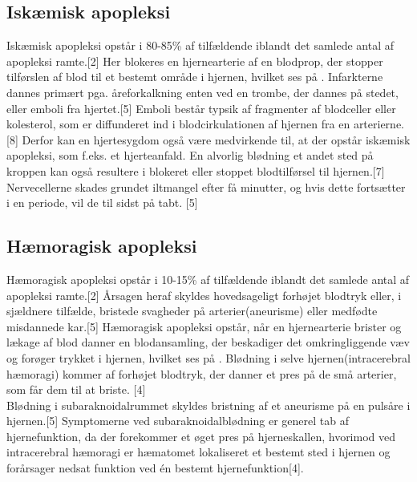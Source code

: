 \subsection{Iskæmisk apopleksi}
Iskæmisk apopleksi opstår i 80-85\% af tilfældende iblandt det samlede antal af apopleksi ramte.[2] Her blokeres en hjernearterie af en blodprop, der stopper tilførslen af blod til et bestemt område i hjernen, hvilket ses på . Infarkterne dannes primært pga. åreforkalkning enten ved en trombe, der dannes på stedet, eller emboli fra hjertet.[5] Emboli består typsik af fragmenter af blodceller eller kolesterol, som er diffunderet ind i blodcirkulationen af hjernen fra en arterierne.[8] Derfor kan en hjertesygdom også være medvirkende til, at der opstår iskæmisk apopleksi, som f.eks. et hjerteanfald. En alvorlig blødning et andet sted på kroppen kan også resultere i blokeret eller stoppet blodtilførsel til hjernen.[7] Nervecellerne skades grundet iltmangel efter få minutter, og hvis dette fortsætter i en periode, vil de til sidst på tabt. [5]

\subsection{Hæmoragisk apopleksi}
Hæmoragisk apopleksi opstår i 10-15\% af tilfældende iblandt det samlede antal af apopleksi ramte.[2] Årsagen heraf skyldes hovedsageligt forhøjet blodtryk eller, i sjældnere tilfælde, bristede svagheder på arterier(aneurisme) eller medfødte misdannede kar.[5] Hæmoragisk apopleksi opstår, når en hjernearterie brister og lækage af blod danner en blodansamling, der beskadiger det omkringliggende væv og forøger trykket i hjernen, hvilket ses på . Blødning i selve hjernen(intracerebral hæmoragi) kommer af forhøjet blodtryk, der danner et pres på de små arterier, som får dem til at briste. [4] \\
Blødning i subaraknoidalrummet skyldes bristning af et aneurisme på en pulsåre i hjernen.[5] Symptomerne ved subaraknoidalblødning er generel tab af hjernefunktion, da der forekommer et øget pres på hjerneskallen, hvorimod ved intracerebral hæmoragi er hæmatomet lokaliseret et bestemt sted i hjernen og forårsager nedsat funktion ved én bestemt hjernefunktion[4]. 

